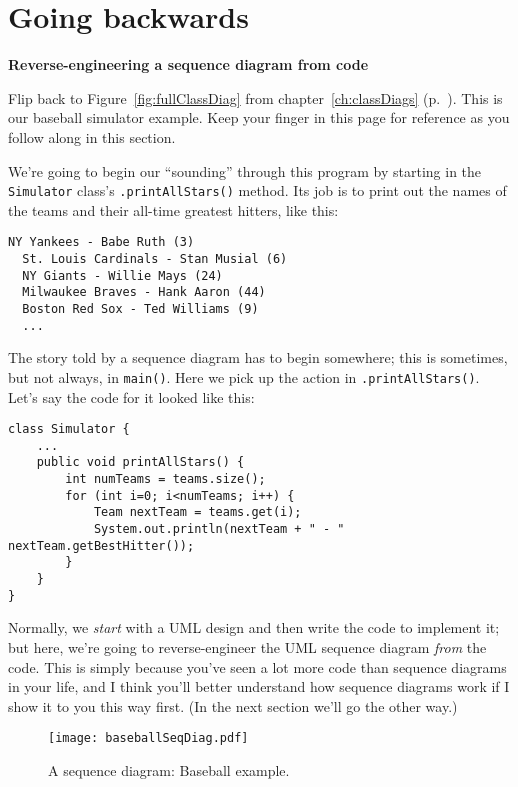 \section{Going backwards}

\vspace{-.2in}
{\large \textbf{Reverse-engineering a sequence diagram from code}}

Flip back to Figure~\ref{fig:fullClassDiag} from chapter~\ref{ch:classDiags}
(p.~\pageref{fig:fullClassDiag}). This is our baseball simulator example. Keep
your finger in this page for reference as you follow along in this section.

We're going to begin our ``sounding'' through this program by starting in the
\texttt{Simulator} class's \texttt{.printAllStars()} method. Its job is to
print out the names of the teams and their all-time greatest hitters, like
this:

\begin{Verbatim}[fontsize=\normalsize,samepage=true,frame=single]
  NY Yankees - Babe Ruth (3)
  St. Louis Cardinals - Stan Musial (6)
  NY Giants - Willie Mays (24)
  Milwaukee Braves - Hank Aaron (44)
  Boston Red Sox - Ted Williams (9)
  ...
\end{Verbatim}

The story told by a sequence diagram has to begin somewhere; this is
sometimes, but not always, in \texttt{main()}. Here we pick up the action in
\texttt{.printAllStars()}. Let's say the code for it looked like this:

\begin{Verbatim}[fontsize=\small,samepage=true,frame=single]
class Simulator {
    ...
    public void printAllStars() {
        int numTeams = teams.size();
        for (int i=0; i<numTeams; i++) {
            Team nextTeam = teams.get(i);
            System.out.println(nextTeam + " - " nextTeam.getBestHitter());
        }
    }
}
\end{Verbatim}

Normally, we \textit{start} with a UML design and then write the code to
implement it; but here, we're going to reverse-engineer the UML sequence
diagram \textit{from} the code. This is simply because you've seen a lot more
code than sequence diagrams in your life, and I think you'll better understand
how sequence diagrams work if I show it to you this way first. (In the next
section we'll go the other way.)

\begin{figure}
\centering
\texttt{[image: baseballSeqDiag.pdf]} %
\vspace{.1in}
\caption{A sequence diagram: Baseball example.}
\label{fig:baseballSeqDiag}
\end{figure}

